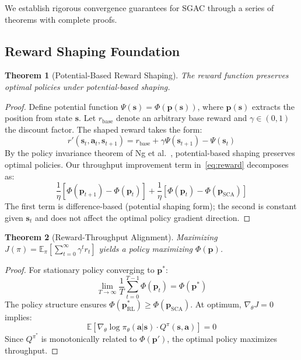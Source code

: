 \documentclass[journal]{IEEEtran}
\newtheorem{theorem}{Theorem}
\begin{document}
We establish rigorous convergence guarantees for SGAC through a series of theorems with complete proofs.

\subsection{Reward Shaping Foundation}

\begin{theorem}[Potential-Based Reward Shaping]
\label{thm:shaping}
The reward function preserves optimal policies under potential-based shaping.
\end{theorem}

\begin{proof}
Define potential function $\Psi(\mathbf{s}) = \Phi(\mathbf{p}(\mathbf{s}))$, where $\mathbf{p}(\mathbf{s})$ extracts the position from state $\mathbf{s}$. Let $r_{\text{base}}$ denote an arbitrary base reward and $\gamma \in (0,1)$ the discount factor. The shaped reward takes the form:
\begin{equation}
r'(\mathbf{s}_t, \mathbf{a}_t, \mathbf{s}_{t+1}) = r_{\text{base}} + \gamma\Psi(\mathbf{s}_{t+1}) - \Psi(\mathbf{s}_t)
\end{equation}
By the policy invariance theorem of Ng et al.~\cite{ng1999}, potential-based shaping preserves optimal policies. Our throughput improvement term in~\eqref{eq:reward} decomposes as:
\begin{equation}
\frac{1}{\eta}\left[\Phi(\mathbf{p}_{t+1}) - \Phi(\mathbf{p}_t)\right] + \frac{1}{\eta}\left[\Phi(\mathbf{p}_t) - \Phi(\mathbf{p}_{\text{SCA}})\right]
\end{equation}
The first term is difference-based (potential shaping form); the second is constant given $\mathbf{s}_t$ and does not affect the optimal policy gradient direction.
\end{proof}

\begin{theorem}[Reward-Throughput Alignment]
\label{thm:alignment}
Maximizing $J(\pi) = \mathbb{E}_\pi[\sum_{t=0}^{\infty} \gamma^t r_t]$ yields a policy maximizing $\Phi(\mathbf{p})$.
\end{theorem}

\begin{proof}
For stationary policy converging to $\mathbf{p}^*$:
\begin{equation}
\lim_{T\to\infty} \frac{1}{T}\sum_{t=0}^{T-1} \Phi(\mathbf{p}_t) = \Phi(\mathbf{p}^*)
\end{equation}
The policy structure ensures $\Phi(\mathbf{p}^*_{\text{RL}}) \geq \Phi(\mathbf{p}_{\text{SCA}})$. At optimum, $\nabla_\theta J = 0$ implies:
\begin{equation}
\mathbb{E}\left[\nabla_\theta \log\pi_\theta(\mathbf{a}|\mathbf{s}) \cdot Q^{\pi}(\mathbf{s}, \mathbf{a})\right] = 0
\end{equation}
Since $Q^{\pi^*}$ is monotonically related to $\Phi(\mathbf{p}')$, the optimal policy maximizes throughput.
\end{proof}
\end{document}

